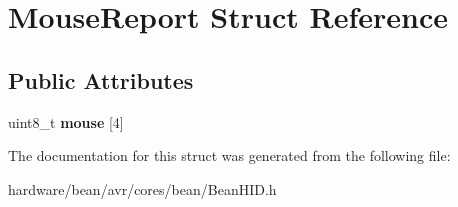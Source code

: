 \hypertarget{struct_mouse_report}{}\section{Mouse\+Report Struct Reference}
\label{struct_mouse_report}
\subsection*{Public Attributes}
\begin{DoxyCompactItemize}
\item 
\hypertarget{struct_mouse_report_abedbcaccb713b83fa301e329461e9664}{}uint8\+\_\+t {\bfseries mouse} \mbox{[}4\mbox{]}\label{struct_mouse_report_abedbcaccb713b83fa301e329461e9664}

\end{DoxyCompactItemize}


The documentation for this struct was generated from the following file\+:\begin{DoxyCompactItemize}
\item 
hardware/bean/avr/cores/bean/Bean\+H\+I\+D.\+h\end{DoxyCompactItemize}
